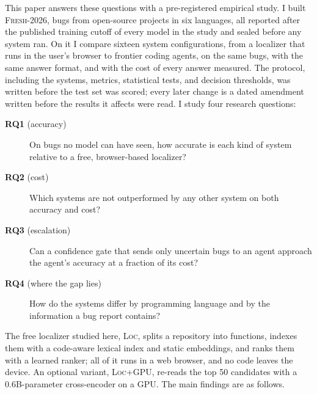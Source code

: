 \documentclass[acmsmall,screen,review,anonymous]{acmart}
\newcommand{\tool}{\textsc{Loc}\xspace}
\newcommand{\tool}{Allfather\xspace}
\newcommand{\toolgpu}{\tool{}+GPU\xspace}
\newcommand{\fresh}{\textsc{Fresh-2026}\xspace}
\newcommand{\RQ}[1]{\textbf{RQ#1}}
\begin{document}
This paper answers these questions with a pre-registered empirical study. I built \fresh, \NBugs{} bugs from \NProjects{} open-source projects in six languages, all reported after the published training cutoff of every model in the study and sealed before any system ran. On it I compare sixteen system configurations, from a localizer that runs in the user's browser to frontier coding agents, on the same bugs, with the same answer format, and with the cost of every answer measured. The protocol, including the systems, metrics, statistical tests, and decision thresholds, was written before the test set was scored; every later change is a dated amendment written before the results it affects were read. I study four research questions:

\begin{description}
\item[\RQ1 (accuracy)] On bugs no model can have seen, how accurate is each kind of system relative to a free, browser-based localizer?
\item[\RQ2 (cost)] Which systems are not outperformed by any other system on both accuracy and cost?
\item[\RQ3 (escalation)] Can a confidence gate that sends only uncertain bugs to an agent approach the agent's accuracy at a fraction of its cost?
\item[\RQ4 (where the gap lies)] How do the systems differ by programming language and by the information a bug report contains?
\end{description}

The free localizer studied here, \tool, splits a repository into functions, indexes them with a code-aware lexical index and static embeddings, and ranks them with a learned ranker; all of it runs in a web browser, and no code leaves the device. An optional variant, \toolgpu, re-reads the top 50 candidates with a 0.6B-parameter cross-encoder on a GPU. The main findings are as follows.
\end{document}
